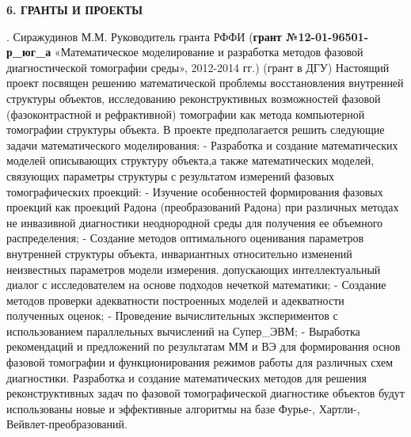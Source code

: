 \noindent \textbf{6. ГРАНТЫ И ПРОЕКТЫ}

\noindent

.  Сиражудинов М.М. Руководитель гранта РФФИ (\textbf{грант №12-01-96501-р\_юг\_а} «Математическое моделирование и разработка методов фазовой диагностической томографии среды», 2012-2014 гг.) (грант в ДГУ) Настоящий проект посвящен решению математической проблемы восстановления внутренней структуры объектов, исследованию реконструктивных возможностей фазовой (фазоконтрастной и рефрактивной) томографии как метода компьютерной томографии структуры объекта. В проекте предполагается решить следующие задачи математического моделирования: - Разработка и создание математических моделей описывающих структуру объекта,а также математических моделей, связующих параметры структуры с результатом измерений фазовых томографических проекций: - Изучение особенностей формирования фазовых проекций как проекций Радона (преобразований Радона) при различных методах не инвазивной диагностики неоднородной среды для получения ее объемного распределения; - Создание методов оптимального оценивания параметров внутренней структуры объекта, инвариантных относительно изменений неизвестных параметров модели измерения. допускающих интеллектуальный диалог с исследователем на основе подходов нечеткой математики; - Создание методов проверки адекватности построенных моделей и адекватности полученных оценок; - Проведение вычислительных экспериментов с использованием параллельных вычислений на Супер\_ЭВМ; - Выработка рекомендаций и предложений по результатам ММ и ВЭ для формирования основ фазовой томографии и функционирования режимов работы для различных схем диагностики. Разработка и создание математических методов для решения реконструктивных задач по фазовой томографической диагностике объектов будут использованы новые и эффективные алгоритмы на базе Фурье-, Хартли-, Вейвлет-преобразований.

